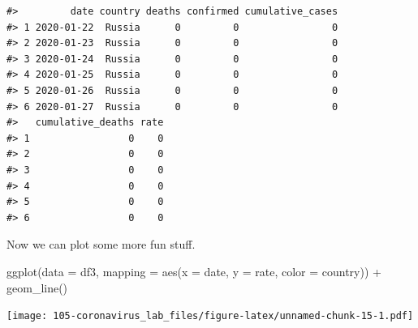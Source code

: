 \documentclass[
]{book}
\newenvironment{Shaded}{\begin{snugshade}}{\end{snugshade}}
\newcommand{\AttributeTok}[1]{\textcolor[rgb]{0.77,0.63,0.00}{#1}}
\newcommand{\FunctionTok}[1]{\textcolor[rgb]{0.00,0.00,0.00}{#1}}
\newcommand{\NormalTok}[1]{#1}
\newcommand{\SpecialCharTok}[1]{\textcolor[rgb]{0.00,0.00,0.00}{#1}}
\begin{document}
\begin{verbatim}
#>         date country deaths confirmed cumulative_cases
#> 1 2020-01-22  Russia      0         0                0
#> 2 2020-01-23  Russia      0         0                0
#> 3 2020-01-24  Russia      0         0                0
#> 4 2020-01-25  Russia      0         0                0
#> 5 2020-01-26  Russia      0         0                0
#> 6 2020-01-27  Russia      0         0                0
#>   cumulative_deaths rate
#> 1                 0    0
#> 2                 0    0
#> 3                 0    0
#> 4                 0    0
#> 5                 0    0
#> 6                 0    0
\end{verbatim}

Now we can plot some more fun stuff.

\begin{Shaded}
\begin{Highlighting}[]

\FunctionTok{ggplot}\NormalTok{(}\AttributeTok{data =}\NormalTok{ df3,}
       \AttributeTok{mapping =} \FunctionTok{aes}\NormalTok{(}\AttributeTok{x =}\NormalTok{ date,}
                     \AttributeTok{y =}\NormalTok{ rate,}
                     \AttributeTok{color =}\NormalTok{ country)) }\SpecialCharTok{+}
  \FunctionTok{geom\_line}\NormalTok{()}
\end{Highlighting}
\end{Shaded}

\texttt{[image: 105-coronavirus\_lab\_files/figure-latex/unnamed-chunk-15-1.pdf]}
\end{document}
